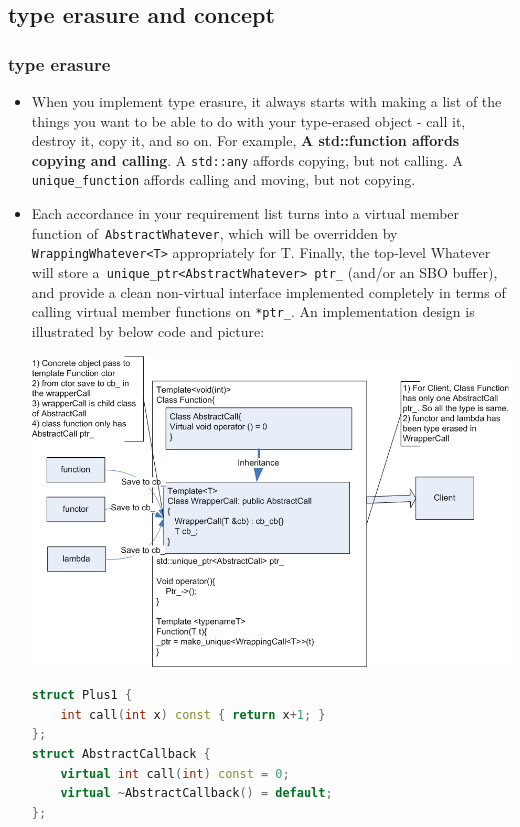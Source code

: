 \documentclass[a4paper,11pt,twoside]{book}
\begin{document}
\subsection{type erasure and concept}

\subsubsection{type erasure}
\begin{itemize}
\item When you implement type erasure, it always starts with making a list of the things you want to be able to do with your type-erased object - call it, destroy it, copy it, and so on. For example, \textbf{A std::function affords copying and calling}. A \texttt{std::any} affords copying, but not calling. A \texttt{unique\_function} affords calling and moving, but not copying.

\item Each accordance in your requirement list turns into a virtual member function of\texttt{ AbstractWhatever}, which will be overridden by \texttt{WrappingWhatever<T>} appropriately for T. Finally, the top-level Whatever will store a\texttt{ unique\_ptr<AbstractWhatever> ptr\_} (and/or an SBO buffer), and provide a clean non-virtual interface implemented completely in terms of calling virtual member functions on \texttt{*ptr\_}. An implementation design is illustrated by below code and picture:

\begin{center}
	\includegraphics[scale=0.9]{pics/function1.png}
\end{center}

\begin{lstlisting}[frame=single, language=c++]
struct Plus1 {
	int call(int x) const { return x+1; }
};
struct AbstractCallback {
	virtual int call(int) const = 0;
	virtual ~AbstractCallback() = default;
};


\end{lstlisting}
\end{itemize}
\end{document}
